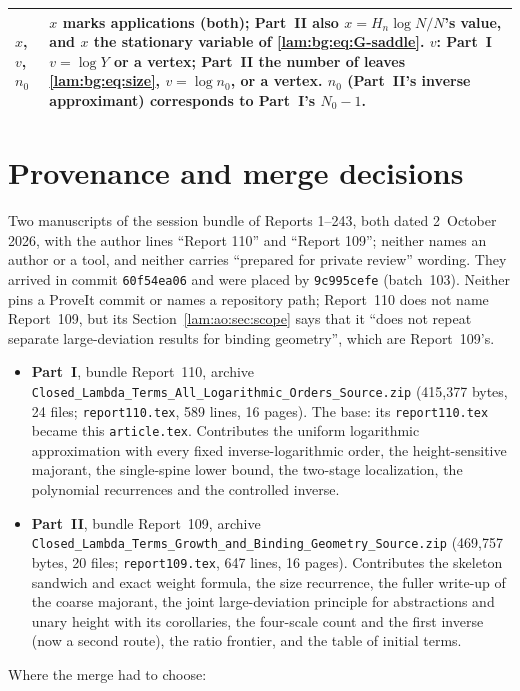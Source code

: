 \documentclass[11pt,a4paper]{article}
\numberwithin{equation}{section}
\theoremstyle{remark}
\newcommand{\file}[1]{\nolinkurl{#1}}
\begin{document}
\begin{longtable}{@{}>{\raggedright\arraybackslash}p{} >{\raggedright\arraybackslash}p{}@{}}
$x$, $v$, $n_0$ & $x$ marks applications (both); Part~II also $x=H_n\log N/N$'s value, and $x$ the stationary variable of \eqref{lam:bg:eq:G-saddle}. $v$: Part~I $v=\log Y$ or a vertex; Part~II the number of leaves \eqref{lam:bg:eq:size}, $v=\log n_0$, or a vertex. $n_0$ (Part~II's inverse approximant) corresponds to Part~I's $N_0-1$.\\
\bottomrule
\end{longtable}
\endgroup

\section*{Provenance and merge decisions}\label{lam:sec:provenance}
Two manuscripts of the session bundle of Reports 1--243, both dated 2~October 2026, with the author lines ``Report 110'' and ``Report 109''; neither names an author or a tool, and neither carries ``prepared for private review'' wording. They arrived in commit \texttt{60f54ea06} and were placed by \texttt{9c995cefe} (batch~103). Neither pins a ProveIt commit or names a repository path; Report~110 does not name Report~109, but its Section~\ref{lam:ao:sec:scope} says that it ``does not repeat separate large-deviation results for binding geometry'', which are Report~109's.
\begin{itemize}
\item \textbf{Part~I}, bundle Report~110, archive \file{Closed_Lambda_Terms_All_Logarithmic_Orders_Source.zip} (415,377 bytes, 24 files; \file{report110.tex}, 589 lines, 16 pages). The base: its \file{report110.tex} became this \file{article.tex}. Contributes the uniform logarithmic approximation with every fixed inverse-logarithmic order, the height-sensitive majorant, the single-spine lower bound, the two-stage localization, the polynomial recurrences and the controlled inverse.
\item \textbf{Part~II}, bundle Report~109, archive \file{Closed_Lambda_Terms_Growth_and_Binding_Geometry_Source.zip} (469,757 bytes, 20 files; \file{report109.tex}, 647 lines, 16 pages). Contributes the skeleton sandwich and exact weight formula, the size recurrence, the fuller write-up of the coarse majorant, the joint large-deviation principle for abstractions and unary height with its corollaries, the four-scale count and the first inverse (now a second route), the ratio frontier, and the table of initial terms.
\end{itemize}
Where the merge had to choose:
\end{document}
